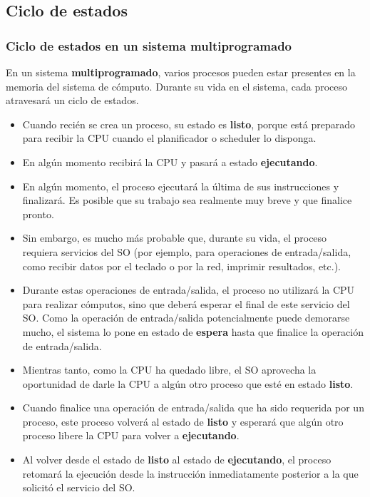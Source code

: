 \documentclass[spanish,a4paper,]{article}
\begin{document}
\hypertarget{ciclo-de-estados}{%
\subsection{Ciclo de estados}\label{ciclo-de-estados}}

\hypertarget{ciclo-de-estados-en-un-sistema-multiprogramado}{%
\subsubsection{Ciclo de estados en un sistema
multiprogramado}\label{ciclo-de-estados-en-un-sistema-multiprogramado}}

En un sistema \textbf{multiprogramado}, varios procesos pueden estar
presentes en la memoria del sistema de cómputo. Durante su vida en el
sistema, cada proceso atravesará un ciclo de estados.

\begin{itemize}
\item
  Cuando recién se crea un proceso, su estado es \textbf{listo}, porque
  está preparado para recibir la CPU cuando el planificador o scheduler
  lo disponga.
\item
  En algún momento recibirá la CPU y pasará a estado
  \textbf{ejecutando}.
\item
  En algún momento, el proceso ejecutará la última de sus instrucciones
  y finalizará. Es posible que su trabajo sea realmente muy breve y que
  finalice pronto.
\item
  Sin embargo, es mucho más probable que, durante su vida, el proceso
  requiera servicios del SO (por ejemplo, para operaciones de
  entrada/salida, como recibir datos por el teclado o por la red,
  imprimir resultados, etc.).
\item
  Durante estas operaciones de entrada/salida, el proceso no utilizará
  la CPU para realizar cómputos, sino que deberá esperar el final de
  este servicio del SO. Como la operación de entrada/salida
  potencialmente puede demorarse mucho, el sistema lo pone en estado de
  \textbf{espera} hasta que finalice la operación de entrada/salida.
\item
  Mientras tanto, como la CPU ha quedado libre, el SO aprovecha la
  oportunidad de darle la CPU a algún otro proceso que esté en estado
  \textbf{listo}.
\item
  Cuando finalice una operación de entrada/salida que ha sido requerida
  por un proceso, este proceso volverá al estado de \textbf{listo} y
  esperará que algún otro proceso libere la CPU para volver a
  \textbf{ejecutando}.
\item
  Al volver desde el estado de \textbf{listo} al estado de
  \textbf{ejecutando}, el proceso retomará la ejecución desde la
  instrucción inmediatamente posterior a la que solicitó el servicio del
  SO.
\end{itemize}
\end{document}
